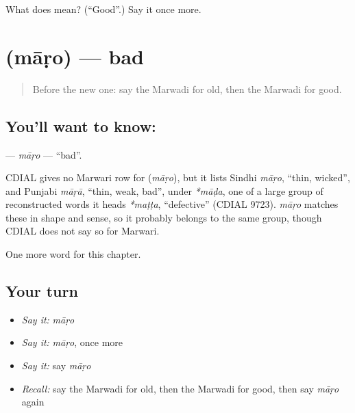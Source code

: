 \begin{tcolorbox}[breakable,colback=teal!4,colframe=teal!35!black,title={Before you move on}]
What does  mean? (\textquotedblleft{}Good\textquotedblright{}.) Say it once more.
\end{tcolorbox}
\section[\texorpdfstring{\mw{माड़ो} (māṛo)}{माड़ो (māṛo)}]{ (māṛo) — bad}

\label{lesson:MW-C73-maro}



\begin{quote}
Before the new one: say the Marwadi for old, then the Marwadi for good.
\end{quote}

\subsection*{You'll want to know: }
\textbf{} — \emph{māṛo} — \textquotedblleft{}bad\textquotedblright{}.

\begin{cousinweb}
CDIAL gives no Marwari row for \textbf{} (\emph{māṛo}), but it lists Sindhi \emph{māṛo}, \textquotedblleft{}thin, wicked\textquotedblright{}, and Punjabi \emph{māṛā}, \textquotedblleft{}thin, weak, bad\textquotedblright{}, under \emph{*māḍa}, one of a large group of reconstructed words it heads \emph{*maṭṭa}, \textquotedblleft{}defective\textquotedblright{} (CDIAL 9723). \emph{māṛo} matches these in shape and sense, so it probably belongs to the same group, though CDIAL does not say so for Marwari.
\end{cousinweb}

\begin{grammarlens}[title={What you've built}]
One more word for this chapter.
\end{grammarlens}

\subsection*{Your turn}
\begin{itemize}
\raggedright
  \item \emph{Say it:} \emph{māṛo}
  \item \emph{Say it:} \emph{māṛo}, once more
  \item \emph{Say it:} say \emph{māṛo}
  \item \emph{Recall:} say the Marwadi for old, then the Marwadi for good, then say \emph{māṛo} again
\end{itemize}

